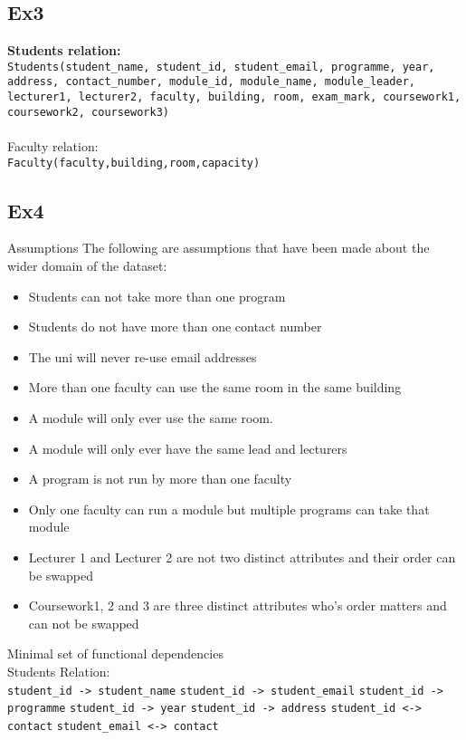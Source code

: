 \documentclass{article}
\begin{document}
\subsection{Ex3}
{\textbf {Students relation:}}\\ 
\texttt{Students(student\_name, student\_id, student\_email, programme, year, address, contact\_number, module\_id, module\_name, module\_leader, lecturer1, lecturer2, faculty, building, room, exam\_mark, coursework1, coursework2, coursework3)\\\\}
Faculty relation:\\ 
\verb|Faculty(faculty,building,room,capacity)|

\newpage
\subsection{Ex4}
{\Large Assumptions}
\newline The following are assumptions that have been made about the wider domain of the dataset:

\begin{itemize}
    \item Students can not take more than one program
    \item Students do not have more than one contact number
    \item The uni will never re-use email addresses
    \item More than one faculty can use the same room in the same building
    \item A module will only ever use the same room.
    \item A module will only ever have the same lead and lecturers
    \item A program is not run by more than one faculty
    \item Only one faculty can run a module but multiple programs can take that module
    \item Lecturer 1 and Lecturer 2 are not two distinct attributes and their order can be swapped 
    \item Coursework1, 2 and 3 are three distinct attributes who's order matters and can not be swapped
\end{itemize}

\noindent
{\Large Minimal set of functional dependencies}\\
Students Relation:\\
\noindent
\verb|student_id -> student_name|\newline
\verb|student_id -> student_email|\newline
\verb|student_id -> programme|\newline
\verb|student_id -> year|\newline
\verb|student_id -> address|\newline
\verb|student_id <-> contact|\newline
\verb|student_email <-> contact|\\
\end{document}
